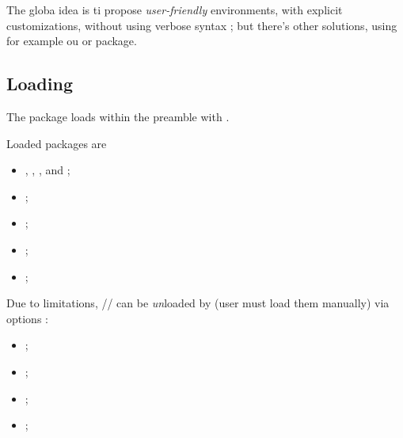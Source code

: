 \documentclass[english,11pt,a4paper]{article}
\begin{document}
\smallskip

The globa idea is ti propose \textit{user-friendly} environments, with explicit customizations, without using verbose syntax ; but there's other solutions, using for example  ou  or  package.

\subsection{Loading}

The package loads within the preamble with .

Loaded packages are 

\begin{itemize}
	\item {}, , ,  and  ;
	\item {} ;
	\item {} ;
	\item {} ;
	\item {} ;
\end{itemize}

Due to limitations, // can be \textit{un}loaded by  (user must load them manually) via options :

\begin{itemize}
	\item {} ;
	\item {} ;
	\item {} ;
	\item {} ;
\end{itemize}

\begin{codehigh}[language=latex/latex3,style/main=teal!25,style/code=teal!25]
\usepackage{customenvs}

\usepackage[option(s)]{customenvs}
\end{codehigh}
\end{document}
